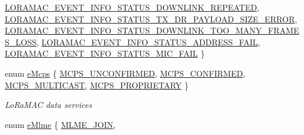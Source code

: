 \begin{DoxyCompactItemize}
\newline
\mbox{\hyperlink{group___l_o_r_a_m_a_c_gga3c4e7a774e25faf1606f577ee5e7d201aaae47a8316ae996d506323e0e6613b9b}{L\+O\+R\+A\+M\+A\+C\+\_\+\+E\+V\+E\+N\+T\+\_\+\+I\+N\+F\+O\+\_\+\+S\+T\+A\+T\+U\+S\+\_\+\+D\+O\+W\+N\+L\+I\+N\+K\+\_\+\+R\+E\+P\+E\+A\+T\+ED}}, 
\mbox{\hyperlink{group___l_o_r_a_m_a_c_gga3c4e7a774e25faf1606f577ee5e7d201a6e7b21fbf0358f3438f2de0fc3fdd866}{L\+O\+R\+A\+M\+A\+C\+\_\+\+E\+V\+E\+N\+T\+\_\+\+I\+N\+F\+O\+\_\+\+S\+T\+A\+T\+U\+S\+\_\+\+T\+X\+\_\+\+D\+R\+\_\+\+P\+A\+Y\+L\+O\+A\+D\+\_\+\+S\+I\+Z\+E\+\_\+\+E\+R\+R\+OR}}, 
\mbox{\hyperlink{group___l_o_r_a_m_a_c_gga3c4e7a774e25faf1606f577ee5e7d201a4a75f7744209239bb80e6af142d0249d}{L\+O\+R\+A\+M\+A\+C\+\_\+\+E\+V\+E\+N\+T\+\_\+\+I\+N\+F\+O\+\_\+\+S\+T\+A\+T\+U\+S\+\_\+\+D\+O\+W\+N\+L\+I\+N\+K\+\_\+\+T\+O\+O\+\_\+\+M\+A\+N\+Y\+\_\+\+F\+R\+A\+M\+E\+S\+\_\+\+L\+O\+SS}}, 
\mbox{\hyperlink{group___l_o_r_a_m_a_c_gga3c4e7a774e25faf1606f577ee5e7d201af141bb217ba31a2dc7d3cc128a13de10}{L\+O\+R\+A\+M\+A\+C\+\_\+\+E\+V\+E\+N\+T\+\_\+\+I\+N\+F\+O\+\_\+\+S\+T\+A\+T\+U\+S\+\_\+\+A\+D\+D\+R\+E\+S\+S\+\_\+\+F\+A\+IL}}, 
\newline
\mbox{\hyperlink{group___l_o_r_a_m_a_c_gga3c4e7a774e25faf1606f577ee5e7d201a43bdb9277722c567c81539fd175a7a63}{L\+O\+R\+A\+M\+A\+C\+\_\+\+E\+V\+E\+N\+T\+\_\+\+I\+N\+F\+O\+\_\+\+S\+T\+A\+T\+U\+S\+\_\+\+M\+I\+C\+\_\+\+F\+A\+IL}}
 \}
\item 
enum \mbox{\hyperlink{group___l_o_r_a_m_a_c_ga7b080a046606f23fe030d0aa6d2a0e30}{e\+Mcps}} \{ \mbox{\hyperlink{group___l_o_r_a_m_a_c_gga7b080a046606f23fe030d0aa6d2a0e30a340afc087e96410da04d07fb0470f84a}{M\+C\+P\+S\+\_\+\+U\+N\+C\+O\+N\+F\+I\+R\+M\+ED}}, 
\mbox{\hyperlink{group___l_o_r_a_m_a_c_gga7b080a046606f23fe030d0aa6d2a0e30a5eb18aef0f2abda0d56add7e868b8546}{M\+C\+P\+S\+\_\+\+C\+O\+N\+F\+I\+R\+M\+ED}}, 
\mbox{\hyperlink{group___l_o_r_a_m_a_c_gga7b080a046606f23fe030d0aa6d2a0e30aba17be1162725df5e78e03b3aeff83fa}{M\+C\+P\+S\+\_\+\+M\+U\+L\+T\+I\+C\+A\+ST}}, 
\mbox{\hyperlink{group___l_o_r_a_m_a_c_gga7b080a046606f23fe030d0aa6d2a0e30a29a54ded2edefe9179a33a14e3ceaca5}{M\+C\+P\+S\+\_\+\+P\+R\+O\+P\+R\+I\+E\+T\+A\+RY}}
 \}
\begin{DoxyCompactList}\small\item\em Lo\+Ra\+M\+AC data services \end{DoxyCompactList}\item 
enum \mbox{\hyperlink{group___l_o_r_a_m_a_c_ga320f4c08fe99747b08463689be624f7b}{e\+Mlme}} \{ \newline
\mbox{\hyperlink{group___l_o_r_a_m_a_c_gga320f4c08fe99747b08463689be624f7ba475ad5dea1c4c13b93b31095c665e92e}{M\+L\+M\+E\+\_\+\+J\+O\+IN}}, 

\end{DoxyCompactItemize}
